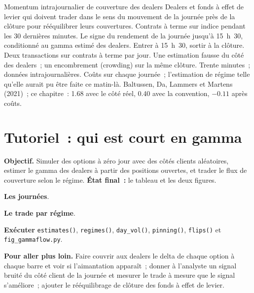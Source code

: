 \begin{strategyfile}{Momentum intrajournalier de couverture des dealers}\label{strat:s2:zero-day-options-and-dealer-gamma-flows:momentum}
 Dealers et fonds à effet de levier qui doivent trader dans le sens du mouvement de la journée près de la clôture pour rééquilibrer leurs couvertures.
 Contrats à terme sur indice pendant les 30 dernières minutes.
 Le signe du rendement de la journée jusqu'à 15~h~30, conditionné au gamma estimé des dealers.
 Entrer à 15~h~30, sortir à la clôture.
 Deux transactions sur contrats à terme par jour.
 Une estimation fausse du côté des dealers~; un encombrement (crowding) sur la même clôture.
 Trente minutes~; données intrajournalières.
 Coûts sur chaque journée~; l'estimation de régime telle qu'elle aurait pu être faite ce matin-là.
 Baltussen, Da, Lammers et Martens (2021)~; ce chapitre~: 1.68 avec le côté réel, 0.40 avec la convention, $-0.11$ après coûts.
\end{strategyfile}

\section{Tutoriel~: qui est court en gamma}\label{tut:s2:zero-day-options-and-dealer-gamma-flows:tut}

\begin{tutorial}
\textbf{Objectif.} Simuler des options à zéro jour avec des côtés clients aléatoires, estimer le gamma des dealers à partir des positions ouvertes, et trader le flux de couverture
selon le régime. \textbf{État final~:} le tableau et les deux figures.
\begin{tutsteps}
\item \textbf{Les journées}.
\label{lst:s2:zero-day-options-and-dealer-gamma-flows:days}
\item \textbf{Le trade par régime}.
\label{lst:s2:zero-day-options-and-dealer-gamma-flows:trade}
\item \textbf{Exécuter} \texttt{estimates()}, \texttt{regimes()}, \texttt{day\_vol()}, \texttt{pinning()}, \texttt{flips()} et
\texttt{fig\_gammaflow.py}.
\end{tutsteps}
\textbf{Pour aller plus loin.} Faire couvrir aux dealers le delta de chaque option à chaque barre et voir si l'aimantation apparaît~; donner à l'analyste un signal bruité
du côté client de la journée et mesurer le trade à mesure que le signal s'améliore~; ajouter le rééquilibrage de clôture des fonds à effet de levier.
\end{tutorial}

